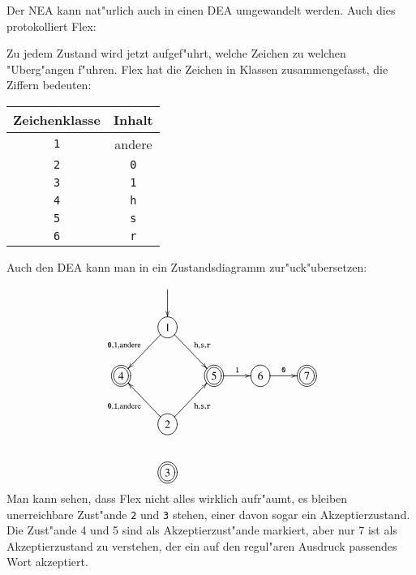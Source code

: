 Der NEA kann nat"urlich auch in einen DEA umgewandelt werden.
Auch dies protokolliert Flex: 

Zu jedem Zustand wird jetzt aufgef"uhrt, welche Zeichen zu welchen
"Uberg"angen f"uhren. Flex hat die Zeichen in Klassen zusammengefasst,
die Ziffern bedeuten:
\begin{center}
\begin{tabular}{|c|c|}
\hline
Zeichenklasse&Inhalt\\
\hline
{\tt 1}&andere\\
{\tt 2}&{\tt 0}\\
{\tt 3}&{\tt 1}\\
{\tt 4}&{\tt h}\\
{\tt 5}&{\tt s}\\
{\tt 6}&{\tt r}\\
\hline
\end{tabular}
\end{center}
Auch den DEA kann man in ein Zustandsdiagramm zur"uck"ubersetzen:
\[
\entrymodifiers={++[o][F]}
\xymatrix{
*+\txt{}
	&*+\txt{}\ar[d]
\\
*+\txt{}
	&{1}\ar[dr]^{{\tt h},{\tt s},{\tt r}} \ar[dl]_{{\tt 0}, {\tt 1}, \text{andere}}
\\
*++[o][F=]{4}
	&*+\txt{}
		&*++[o][F=]{5}\ar[r]^{\tt 1}
			&{6}\ar[r]^{\tt 0}
				&*++[o][F=]{7}
\\
*+\txt{}
	&{2}\ar[ur]_{{\tt h},{\tt s},{\tt r}} \ar[ul]^{{\tt 0}, {\tt 1}, \text{andere}}
\\
*+\txt{}
	&*++[o][F=]{3}
}
\]
Man kann sehen, dass Flex nicht alles wirklich aufr"aumt, es bleiben
unerreichbare Zust"ande {\tt 2} und {\tt 3} stehen, einer davon sogar ein
Akzeptierzustand. Die Zust"ande 4 und 5 sind als
Akzeptierzust"ande markiert, aber nur 7 ist als Akzeptierzustand zu
verstehen, der ein auf den regul"aren Ausdruck passendes Wort
akzeptiert.

